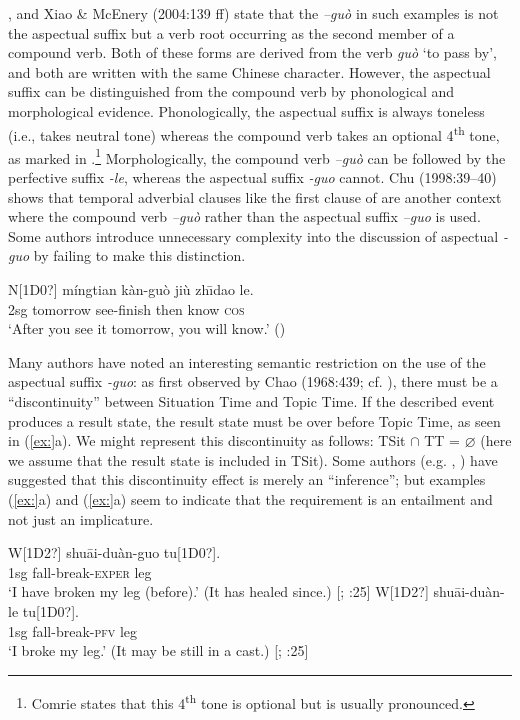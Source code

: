 \citet[251]{Chao1968}, \citet[59]{Comrie1976} and Xiao \& McEnery (2004:139 ff) state that the \textit{–guò} in such examples is not the aspectual suffix but a verb root occurring as the second member of a compound verb. Both of these forms are derived from the verb \textit{guò} ‘to pass by’, and both are written with the same Chinese character. However, the aspectual suffix can be distinguished from the compound verb by phonological and morphological evidence. Phonologically, the aspectual suffix is always toneless (i.e., takes neutral tone) whereas the compound verb takes an optional 4\textsuperscript{th} tone, as marked in .\footnote{Comrie states that this 4\textsuperscript{th} tone is optional but is usually pronounced.} Morphologically, the compound verb \textit{–guò} can be followed by the perfective suffix \textit{-le}, whereas the aspectual suffix \textit{-guo} cannot. Chu (1998:39–40) shows that temporal adverbial clauses like the first clause of  are another context where the compound verb \textit{–guò} rather than the aspectual suffix \textit{–guo} is used. Some authors introduce unnecessary complexity into the discussion of aspectual \textit{-guo} by failing to make this distinction.


\ea
\gll N[1D0?]  míngtian  kàn-guò  jiù  zh\={\i}dao  le.\\
2sg  tomorrow  see-finish  then  know  \textsc{cos}\\
\glt ‘After you see it tomorrow, you will know.’  (\citealt{Chen1979})
\z


Many authors have noted an interesting semantic restriction on the use of the aspectual suffix \textit{-guo}: as first observed by Chao (1968:439; cf. \citealt{Yeh1996}), there must be a “discontinuity” between Situation Time and Topic Time. If the described event produces a result state, the result state must be over before Topic Time, as seen in (\ref{ex:}a). We might represent this discontinuity as follows: TSit ${\cap}$ TT = ⌀ (here we assume that the result state is included in TSit). Some authors (e.g. \citealt{Iljic1990}, \citealt{Yeh1996}) have suggested that this discontinuity effect is merely an “inference”; but examples (\ref{ex:}a) and (\ref{ex:}a) seem to indicate that the requirement is an entailment and not just an implicature.


\ea
\ea  \gll W[1D2?]  shu\=ai-duàn-guo  tu[1D0?].\\
1sg  fall-break-\textsc{exper}  leg\\
\glt ‘I have broken my leg (before).’ (It has healed since.) [\citealt{Chao1968}; \citealt{Ma1977}:25]
\ex \gll W[1D2?]  shu\=ai-duàn-le  tu[1D0?].\\
1sg  fall-break-\textsc{pfv}  leg\\
\glt ‘I broke my leg.’  (It may be still in a cast.)  [\citealt{Chao1968}; \citealt{Ma1977}:25]
\z \z

